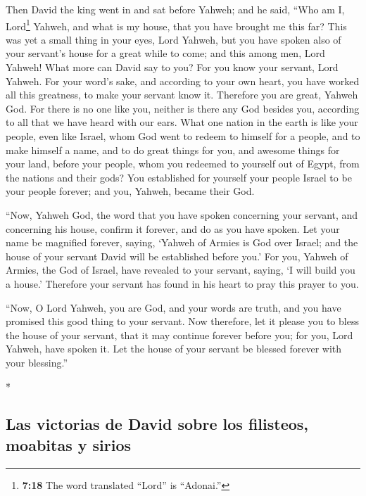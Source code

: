 \begin{paracol}{2}
\begin{otherlanguage}{english}
 Then David the king went in and sat before Yahweh; and
he said, ``Who am I, Lord\footnote{\textbf{7:18} The word translated
  ``Lord'' is ``Adonai.''} Yahweh, and what is my house, that you have
brought me this far?  This was yet a small thing in your
eyes, Lord Yahweh, but you have spoken also of your servant's house for
a great while to come; and this among men, Lord Yahweh! 
What more can David say to you? For you know your servant, Lord Yahweh.
 For your word's sake, and according to your own heart,
you have worked all this greatness, to make your servant know it.
 Therefore you are great, Yahweh God. For there is no one
like you, neither is there any God besides you, according to all that we
have heard with our ears.  What one nation in the earth
is like your people, even like Israel, whom God went to redeem to
himself for a people, and to make himself a name, and to do great things
for you, and awesome things for your land, before your people, whom you
redeemed to yourself out of Egypt, from the nations and their gods?
 You established for yourself your people Israel to be
your people forever; and you, Yahweh, became their God.

 ``Now, Yahweh God, the word that you have spoken
concerning your servant, and concerning his house, confirm it forever,
and do as you have spoken.  Let your name be magnified
forever, saying, `Yahweh of Armies is God over Israel; and the house of
your servant David will be established before you.'  For
you, Yahweh of Armies, the God of Israel, have revealed to your servant,
saying, `I will build you a house.' Therefore your servant has found in
his heart to pray this prayer to you.

 ``Now, O Lord Yahweh, you are God, and your words are
truth, and you have promised this good thing to your servant.
 Now therefore, let it please you to bless the house of
your servant, that it may continue forever before you; for you, Lord
Yahweh, have spoken it. Let the house of your servant be blessed forever
with your blessing.''

\end{otherlanguage}

\switchcolumn[0]*

\hypertarget{las-victorias-de-david-sobre-los-filisteos-moabitas-y-sirios}{%
\subsection{Las victorias de David sobre los filisteos, moabitas y
sirios}\label{las-victorias-de-david-sobre-los-filisteos-moabitas-y-sirios}}


\end{paracol}

